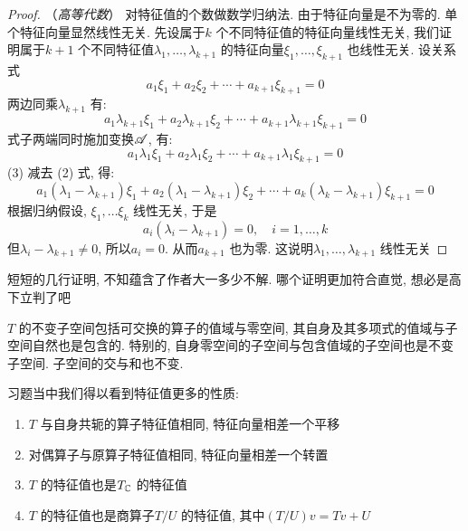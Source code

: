 \begin{proof}
    （\textit{高等代数}）
    对特征值的个数做数学归纳法. 由于特征向量是不为零的. 单个特征向量显然线性无关. 先设属于\(k\)
    个不同特征值的特征向量线性无关, 我们证明属于\(k+1\) 个不同特征值\(\lambda_1,\dots
    ,\lambda_{k+1}\) 的特征向量\(\xi_1,\dots ,\xi_{k+1}\) 也线性无关.
    设关系式
    \begin{equation}
        a_1\xi_1 + a_2\xi_2 + \cdots + a_{k+1}\xi_{k+1} = 0 \tag{1}
    \end{equation}
    两边同乘\(\lambda_{k+1}\) 有:
    \[
        a_1\lambda_{k+1}\xi_1 + a_2\lambda_{k+1}\xi_2 +
        \cdots + a_{k+1}\lambda_{k+1}\xi_{k+1} = 0 \tag{2}
    \]
    式子两端同时施加变换\(\mathscr{A}\), 有:
    \[
        a_1\lambda_1\xi_1 + a_2\lambda_1\xi_2 + \cdots +
        a_{k+1}\lambda_1\xi_{k+1} = 0 \tag{3}
    \]
    (3) 减去 (2) 式, 得:
    \[
        a_1(\lambda_1 - \lambda_{k+1})\xi_1 + a_2(\lambda_1
        - \lambda_{k+1})\xi_2 + \cdots +
        a_{k}(\lambda_{k} - \lambda_{k+1})\xi_{k+1} = 0
    \]
    根据归纳假设, \(\xi_1,\dots \xi_{k}\) 线性无关, 于是
    \[
        a_{i}(\lambda_{i} - \lambda_{k+1}) = 0, \quad i=1,\dots ,k
    \]
    但\(\lambda_{i}-\lambda_{k+1}\neq 0\), 所以\(a_{i}=0\).
    从而\(a_{k+1}\) 也为零. 这说明\(\lambda_1,\dots ,\lambda_{k+1}\) 线性无关
\end{proof}

短短的几行证明, 不知蕴含了作者大一多少不解. 哪个证明更加符合直觉,
想必是高下立判了吧

\(T\) 的不变子空间包括可交换的算子的值域与零空间, 其自身及其多项式的值域与子空间自然也是包含的.
特别的, 自身零空间的子空间与包含值域的子空间也是不变子空间. 子空间的交与和也不变.

习题当中我们得以看到特征值更多的性质:
\begin{enumerate}
    \item \(T\) 与自身共轭的算子特征值相同, 特征向量相差一个平移
    \item 对偶算子与原算子特征值相同, 特征向量相差一个转置
    \item \(T\) 的特征值也是\(T_{\mathbb{C}}\) 的特征值
    \item \(T\) 的特征值也是商算子\(T/U\) 的特征值, 其中\((T/U)v=Tv+U\)
\end{enumerate}
